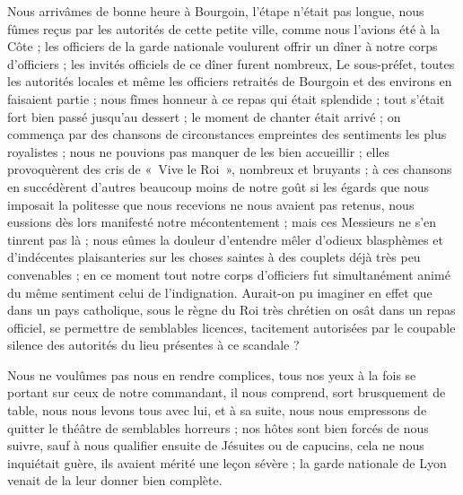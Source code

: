 \documentclass[11pt,a4paper]{report}
\begin{document}
Nous arrivâmes de bonne heure à Bourgoin, l'étape n'était pas longue, nous fûmes reçus par les autorités de cette petite ville, comme nous l'avions été à la Côte ; les officiers de la garde nationale voulurent offrir un dîner à notre corps d'officiers ; les invités officiels de ce dîner furent nombreux, Le sous-préfet, toutes les autorités locales et même les officiers retraités de Bourgoin et des environs en faisaient partie ; nous fîmes honneur à ce repas qui était splendide ; tout s'était fort bien passé jusqu'au dessert ; le moment de chanter était arrivé ; on commença par des chansons de circonstances empreintes des sentiments les plus royalistes ; nous ne pouvions pas manquer de les bien accueillir ; elles provoquèrent des cris de «~Vive le Roi~», nombreux et bruyants ; à ces chansons en succédèrent d'autres beaucoup moins de notre goût si les égards que nous imposait la politesse que nous recevions ne nous avaient pas retenus, nous eussions dès lors manifesté notre mécontentement ; mais ces Messieurs ne s'en tinrent pas là ; nous eûmes la douleur d'entendre mêler d'odieux blasphèmes et d'indécentes plaisanteries sur les choses saintes à des couplets déjà très peu convenables ; en ce moment tout notre corps d'officiers fut simultanément animé du même sentiment celui de l'indignation. Aurait-on pu imaginer en effet que dans un pays catholique, sous le règne du Roi très chrétien on osât dans un repas officiel, se permettre de semblables licences, tacitement autorisées par le coupable silence des autorités du lieu présentes à ce scandale ?

Nous ne voulûmes pas nous en rendre complices, tous nos yeux à la fois se portant sur ceux de notre commandant, il nous comprend, sort brusquement de table, nous nous levons tous avec lui, et à sa suite, nous nous empressons de quitter le théâtre de semblables horreurs ; nos hôtes sont bien forcés de nous suivre, sauf à nous qualifier ensuite de Jésuites ou de capucins, cela ne nous inquiétait guère, ils avaient mérité une leçon sévère ; la garde nationale de Lyon venait de la leur donner bien complète.
\end{document}
